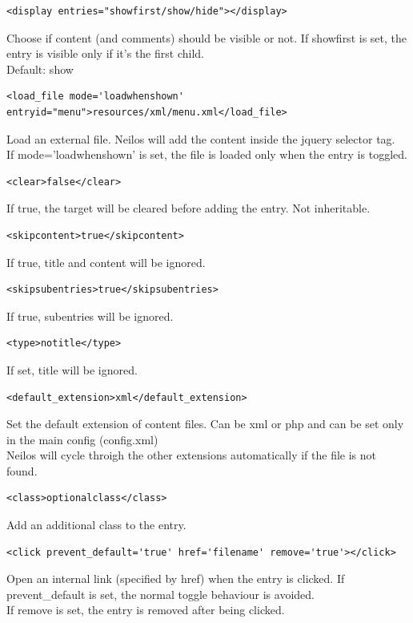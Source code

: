 \documentclass[a4paper,12pt]{article}
\begin{document}
\begin{list}{-}{}
\begin{verbatim}
<display entries="showfirst/show/hide"></display>
\end{verbatim}
Choose if content (and comments) should be visible or not. If showfirst is set, the entry is visible only if it's the first child.\\
Default: show
\item \begin{verbatim}
<load_file mode='loadwhenshown' 
entryid="menu">resources/xml/menu.xml</load_file>
      \end{verbatim}
Load an external file. Neilos will add the content inside the jquery selector tag.\\
If mode='loadwhenshown' is set, the file is loaded only when the entry is toggled.
\item \begin{verbatim}
<clear>false</clear>
\end{verbatim}
If true, the target will be cleared before adding the entry. Not inheritable.
\item \begin{verbatim}
<skipcontent>true</skipcontent>
\end{verbatim}
If true, title and content will be ignored.
\item \begin{verbatim}
<skipsubentries>true</skipsubentries>
\end{verbatim}
If true, subentries will be ignored.
\item \begin{verbatim}
<type>notitle</type>
\end{verbatim}
If set, title will be ignored.
\item \begin{verbatim}
<default_extension>xml</default_extension>
\end{verbatim}
Set the default extension of content files. Can be xml or php and can be set only in the main config (config.xml)\\
Neilos will cycle throigh the other extensions automatically if the file is not found.
\item \begin{verbatim}
<class>optionalclass</class>
\end{verbatim}
Add an additional class to the entry.
\item \begin{verbatim}
<click prevent_default='true' href='filename' remove='true'></click>
\end{verbatim}
Open an internal link (specified by href) when the entry is clicked. If prevent\_default is set, the normal toggle behaviour is avoided.\\
If remove is set, the entry is removed after being clicked.
\end{list}
\normalsize
\end{document}
